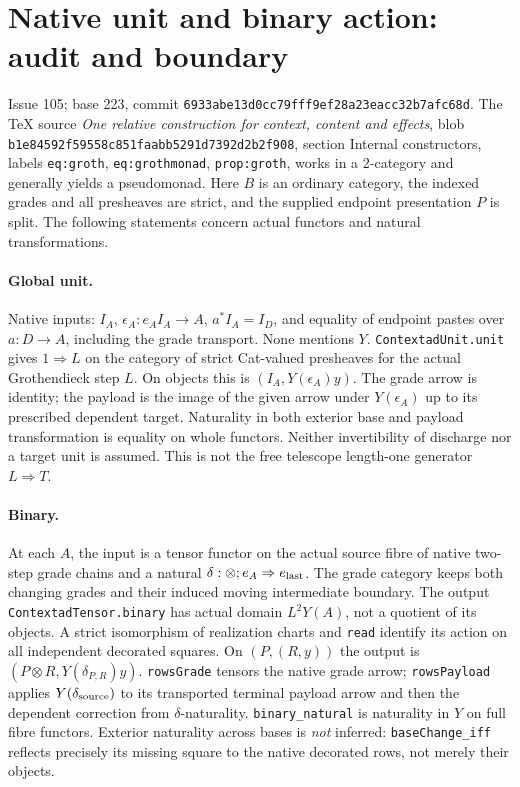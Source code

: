 \documentclass{article}
\begin{document}
\section*{Native unit and binary action: audit and boundary}
Issue 105; base 223, commit \texttt{6933abe13d0cc79fff9ef28a23eacc32b7afc68d}.
The TeX source \emph{One relative construction for context, content and effects},
blob \texttt{b1e84592f59558c851faabb5291d7392d2b2f908}, section Internal
constructors, labels \texttt{eq:groth}, \texttt{eq:grothmonad},
\texttt{prop:groth}, works in a 2-category and generally yields a pseudomonad.
Here $B$ is an ordinary category, the indexed grades and all presheaves
are strict, and the supplied endpoint presentation $P$ is split. The
following statements concern actual functors and natural transformations.
\paragraph{Global unit.} Native inputs: $I_A$, $\epsilon_A:e_AI_A\to A$,
$a^*I_A=I_D$, and equality of endpoint pastes over $a:D\to A$, including
the grade transport. None mentions $Y$. \texttt{ContextadUnit.unit} gives
$1\Rightarrow L$ on the category of strict Cat-valued presheaves for the
actual Grothendieck step $L$. On objects this is $(I_A,Y(\epsilon_A)y)$.
The grade arrow is identity; the payload is the image of the given arrow
under $Y(\epsilon_A)$ up to its prescribed dependent target. Naturality in
both exterior base and payload transformation is equality on whole functors.
Neither invertibility of discharge nor a target unit is assumed. This is
not the free telescope length-one generator $L\Rightarrow T$.
\paragraph{Binary.} At each $A$, the input is a tensor functor on the
actual source fibre of native two-step grade chains and a natural
$\delta:\otimes;e_A\Rightarrow e_{\rm last}$. The grade category keeps
both changing grades and their induced moving intermediate boundary. The
output \texttt{ContextadTensor.binary} has actual domain $L^2Y(A)$, not a
quotient of its objects. A strict isomorphism of realization charts and
\texttt{read} identify its action on all independent decorated squares.
On $(P,(R,y))$ the output is $(P\otimes R,Y(\delta_{P,R})y)$.
\texttt{rowsGrade} tensors the native grade arrow; \texttt{rowsPayload}
applies $Y(\delta_{\rm source})$ to its transported terminal payload arrow
and then the dependent correction from $\delta$-naturality.
\texttt{binary\_natural} is naturality in $Y$ on full fibre functors.
Exterior naturality across bases is \emph{not} inferred:
\texttt{baseChange\_iff} reflects precisely its missing square to the
native decorated rows, not merely their objects.
\end{document}
